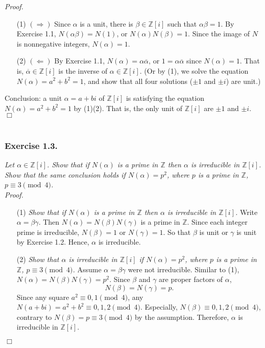\documentclass{article}
\begin{document}
\emph{Proof.}
\begin{enumerate}
\item[(1)]
\emph{$(\Longrightarrow)$}
Since $\alpha$ is a unit, there is $\beta \in \mathbb{Z}[i]$ such that
$\alpha \beta = 1$.
By Exercise 1.1, $N(\alpha \beta) = N(1)$, or $N(\alpha) N(\beta) = 1$.
Since the image of $N$ is nonnegative integers, $N(\alpha) = 1$.
\item[(2)]
\emph{$(\Longleftarrow)$}
By Exercise 1.1, $N(\alpha) = \alpha \overline{\alpha}$,
or $1 = \alpha \overline{\alpha}$ since $N(\alpha) = 1$.
That is, $\overline{\alpha} \in \mathbb{Z}[i]$ is
the inverse of $\alpha \in \mathbb{Z}[i]$.
(Or by (1), we solve the equation $N(\alpha) = a^2 + b^2 = 1$,
and show that all four solutions ($\pm 1$ and $\pm i$) are unit.)
\end{enumerate}
Conclusion: a unit $\alpha = a+bi$ of $\mathbb{Z}[i]$
is satisfying the equation $N(\alpha) = a^2 + b^2 = 1$ by (1)(2).
That is, the only unit of $\mathbb{Z}[i]$ are $\pm 1$ and $\pm i$.
$\Box$ \\\\






\subsubsection*{Exercise 1.3.}
\emph{Let $\alpha \in \mathbb{Z}[i]$.
Show that if $N(\alpha)$ is a prime in $\mathbb{Z}$ then
$\alpha$ is irreducible in $\mathbb{Z}[i]$.
Show that the same conclusion holds
if $N(\alpha) = p^2$, where $p$ is a prime in $\mathbb{Z}$,
$p \equiv 3 \pmod{4}$.} \\

\emph{Proof.}
\begin{enumerate}
\item[(1)]
\emph{Show that if $N(\alpha)$ is a prime in $\mathbb{Z}$ then
$\alpha$ is irreducible in $\mathbb{Z}[i]$.}
Write $\alpha = \beta\gamma$.
Then $N(\alpha) = N(\beta)N(\gamma)$ is a prime in $\mathbb{Z}$.
Since each integer prime is irreducible, $N(\beta) = 1$ or $N(\gamma) = 1$.
So that $\beta$ is unit or $\gamma$ is unit by Exercise 1.2.
Hence, $\alpha$ is irreducible.
\item[(2)]
\emph{Show that $\alpha$ is irreducible in $\mathbb{Z}[i]$
if $N(\alpha) = p^2$, where $p$ is a prime in $\mathbb{Z}$,
$p \equiv 3 \pmod{4}$.}
Assume $\alpha = \beta\gamma$ were not irreducible.
Similar to (1), $N(\alpha) = N(\beta)N(\gamma) = p^2$.
Since $\beta$ and $\gamma$ are proper factors of $\alpha$,
$$N(\beta) = N(\gamma) = p.$$
Since any square $a^2 \equiv 0, 1 \pmod{4}$,
any $N(a+bi) = a^2+b^2 \equiv 0, 1, 2 \pmod{4}$.
Especially, $N(\beta) \equiv 0, 1, 2 \pmod{4}$,
contrary to $N(\beta) = p \equiv 3 \pmod{4}$
by the assumption.
Therefore, $\alpha$ is irreducible in $\mathbb{Z}[i]$.
\end{enumerate}
$\Box$ \\
\end{document}
